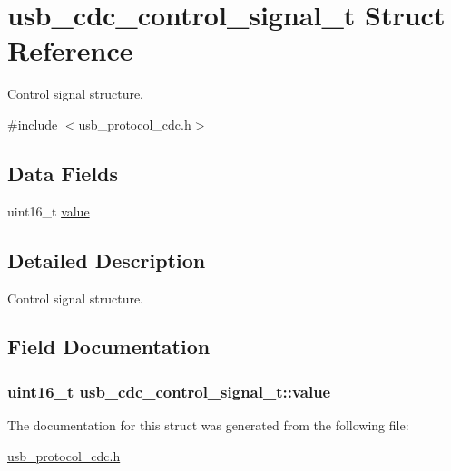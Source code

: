 \hypertarget{structusb__cdc__control__signal__t}{
\section{usb\-\_\-cdc\-\_\-control\-\_\-signal\-\_\-t \-Struct \-Reference}
\label{structusb__cdc__control__signal__t}
}


\-Control signal structure.  




{\ttfamily \#include $<$usb\-\_\-protocol\-\_\-cdc.\-h$>$}

\subsection*{\-Data \-Fields}
\begin{DoxyCompactItemize}
\item 
uint16\-\_\-t \hyperlink{structusb__cdc__control__signal__t_a31c0208763a9d48548785c734f04b097}{value}
\end{DoxyCompactItemize}


\subsection{\-Detailed \-Description}
\-Control signal structure. 

\subsection{\-Field \-Documentation}
\hypertarget{structusb__cdc__control__signal__t_a31c0208763a9d48548785c734f04b097}{
\subsubsection[{value}]{\setlength{\rightskip}{0pt plus 5cm}uint16\-\_\-t {\bf usb\-\_\-cdc\-\_\-control\-\_\-signal\-\_\-t\-::value}}}
\label{structusb__cdc__control__signal__t_a31c0208763a9d48548785c734f04b097}


\-The documentation for this struct was generated from the following file\-:\begin{DoxyCompactItemize}
\item 
\hyperlink{usb__protocol__cdc_8h}{usb\-\_\-protocol\-\_\-cdc.\-h}\end{DoxyCompactItemize}
